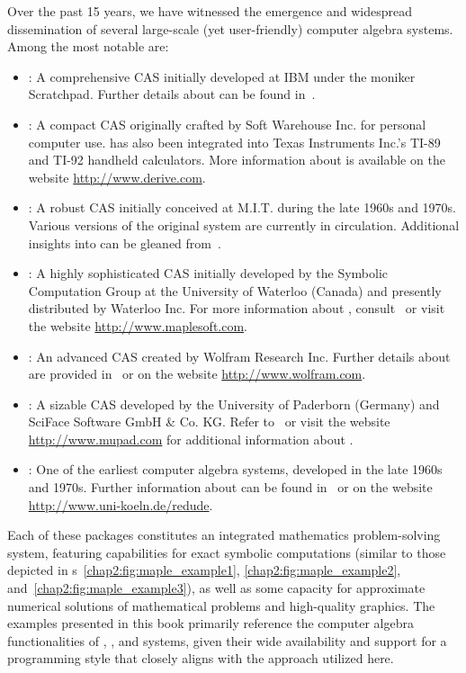 Over the past 15 years, we have witnessed the emergence and widespread dissemination of several large-scale (yet user-friendly) computer algebra systems. Among the most notable are:
%
\begin{itemize}
  \item \Axiom{}: A comprehensive \ac{CAS} initially developed at IBM under the moniker Scratchpad. Further details about \Axiom{} can be found in~\citet{jenks1992axiom}.
  \item \Derive{}: A compact \ac{CAS} originally crafted by Soft Warehouse Inc. for personal computer use. \Derive{} has also been integrated into Texas Instruments Inc.'s TI-89 and TI-92 handheld calculators. More information about \Derive{} is available on the website \url{http://www.derive.com}.
  \item \Macsyma{}: A robust \ac{CAS} initially conceived at M.I.T. during the late 1960s and 1970s. Various versions of the original \Macsyma{} system are currently in circulation. Additional insights into \Macsyma{} can be gleaned from~\citet{wester1999computer}.
  \item \Maple{}: A highly sophisticated \ac{CAS} initially developed by the Symbolic Computation Group at the University of Waterloo (Canada) and presently distributed by Waterloo \Maple{} Inc. For more information about \Maple{}, consult~\citet{heck2003introduction} or visit the website \url{http://www.maplesoft.com}.
  \item \Mathematica{}: An advanced \ac{CAS} created by Wolfram Research Inc. Further details about \Mathematica{} are provided in~\citet{wolfram2003mathematica} or on the website \url{http://www.wolfram.com}.
  \item \MuPAD{}: A sizable \ac{CAS} developed by the University of Paderborn (Germany) and SciFace Software GmbH \& Co. KG. Refer to~\citet{creutzig2004mupad} or visit the website \url{http://www.mupad.com} for additional information about \MuPAD{}.
  \item \Reduce{}: One of the earliest computer algebra systems, developed in the late 1960s and 1970s. Further information about \Reduce{} can be found in~\citet{rayna1987reduce} or on the website \url{http://www.uni-koeln.de/redude}.
\end{itemize}
%
Each of these packages constitutes an integrated mathematics problem-solving system, featuring capabilities for exact symbolic computations (similar to those depicted in \figurename{}s~\ref{chap2:fig:maple_example1}, \ref{chap2:fig:maple_example2}, and~\ref{chap2:fig:maple_example3}), as well as some capacity for approximate numerical solutions of mathematical problems and high-quality graphics. The examples presented in this book primarily reference the computer algebra functionalities of \Maple{}, \Mathematica{}, and \MuPAD{} systems, given their wide availability and support for a programming style that closely aligns with the approach utilized here.

